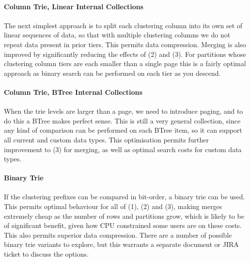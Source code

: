 \documentclass[fleqn]{article}
\begin{document}
\paragraph{Column Trie, Linear Internal Collections}
\paragraph{}
    The next simplest approach is to split each clustering column into its own set of linear
    sequences of data, so that with multiple clustering columns we do not repeat data present
    in prior tiers. This permits data compression. Merging is also improved by significantly
    reducing the effects of (2) and (3). For partitions whose clustering column tiers are 
    each smaller than a single page this is a fairly optimal approach as binary search 
    can be performed on each tier as you descend.
\paragraph{Column Trie, BTree Internal Collections}
\paragraph{}
    When the trie levels are larger than a page, we need to introduce paging, and to do this a
    BTree makes perfect sense. This is still a very general collection, since any kind of comparison
    can be performed on each BTree item, so it can support all current and custom data types.
    This optimisation permits further improvement to (3) for merging, as well as optimal
    search costs for custom data types. 
\paragraph{Binary Trie}
\paragraph{}
    If the clustering prefixes can be compared in bit-order, a binary trie can be used.
    This permits optimal behaviour for all of (1), (2) and (3), making merges extremely
    cheap as the number of rows and partitions grow, which is likely to be of significant benefit,
    given how CPU constrained some users are on these costs. This also permits superior
    data compression. There are a number of possible binary trie variants to explore, but this
    warrants a separate document or JIRA ticket to discuss the options.
\end{document}
